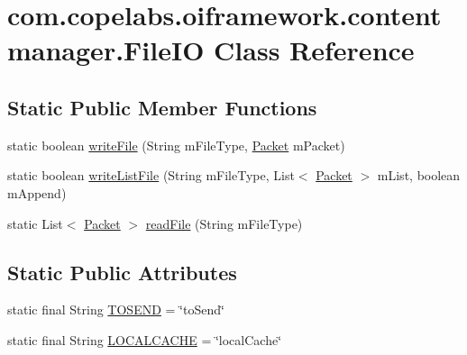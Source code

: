\hypertarget{classcom_1_1copelabs_1_1oiframework_1_1contentmanager_1_1_file_i_o}{}\section{com.\+copelabs.\+oiframework.\+contentmanager.\+File\+I\+O Class Reference}
\label{classcom_1_1copelabs_1_1oiframework_1_1contentmanager_1_1_file_i_o}
\subsection*{Static Public Member Functions}
\begin{DoxyCompactItemize}
\item 
static boolean \hyperlink{classcom_1_1copelabs_1_1oiframework_1_1contentmanager_1_1_file_i_o_a2df9515173743d46faef0274084d6935}{write\+File} (String m\+File\+Type, \hyperlink{classcom_1_1copelabs_1_1oiframework_1_1contentmanager_1_1_packet}{Packet} m\+Packet)
\item 
static boolean \hyperlink{classcom_1_1copelabs_1_1oiframework_1_1contentmanager_1_1_file_i_o_a22cf8b7f32ae6edf30f15ff7c22fe10a}{write\+List\+File} (String m\+File\+Type, List$<$ \hyperlink{classcom_1_1copelabs_1_1oiframework_1_1contentmanager_1_1_packet}{Packet} $>$ m\+List, boolean m\+Append)
\item 
static List$<$ \hyperlink{classcom_1_1copelabs_1_1oiframework_1_1contentmanager_1_1_packet}{Packet} $>$ \hyperlink{classcom_1_1copelabs_1_1oiframework_1_1contentmanager_1_1_file_i_o_af5945c991b9583e337bc8338b56003c9}{read\+File} (String m\+File\+Type)
\end{DoxyCompactItemize}
\subsection*{Static Public Attributes}
\begin{DoxyCompactItemize}
\item 
static final String \hyperlink{classcom_1_1copelabs_1_1oiframework_1_1contentmanager_1_1_file_i_o_abe358da5948b9b2ff2c7665a57449c1b}{T\+O\+S\+E\+N\+D} = \char`\"{}to\+Send\char`\"{}
\item 
static final String \hyperlink{classcom_1_1copelabs_1_1oiframework_1_1contentmanager_1_1_file_i_o_aae6e1cf43bcb1f5dc468ecfaa4445ba8}{L\+O\+C\+A\+L\+C\+A\+C\+H\+E} = \char`\"{}local\+Cache\char`\"{}
\end{DoxyCompactItemize}
